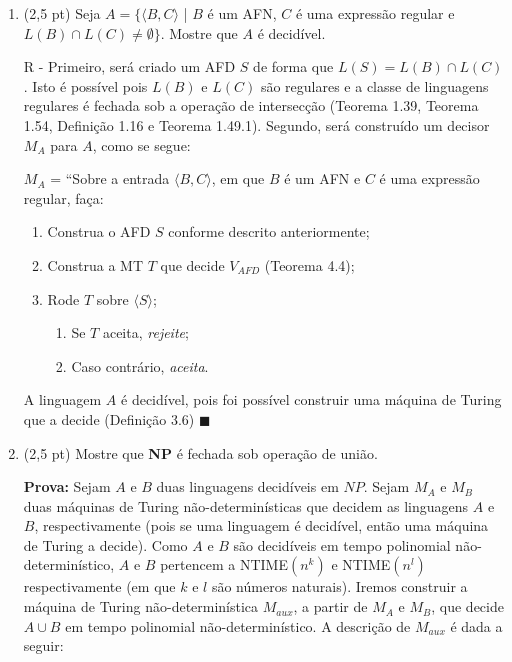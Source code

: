\documentclass[12pt,a4paper,oneside]{article}
\begin{document}
\begin{enumerate}
{		A linguagem $A$ é decidível, pois foi possível construir uma máquina de Turing que a decide (Definição 3.6) $\blacksquare$
		
	}	
	
	\newpage
	
	\item (2,5 pt)  Seja $A = \{ \langle B,C \rangle$ | $B$ é um AFN, $C$ é uma expressão regular e $L(B) \cap L(C) \not= \emptyset \}$. Mostre que $A$ é decidível.
	
	\vspace{0.3cm}
	
	\vspace{0.3cm}
	
	{\color{blue}
		R - Primeiro, será criado um AFD $S$ de forma que $L(S) = L(B) \cap L(C)$. Isto é possível pois $L(B)$ e $L(C)$ são regulares e a classe de linguagens regulares é fechada sob a operação de intersecção (Teorema 1.39, Teorema 1.54, Definição 1.16 e Teorema 1.49.1). Segundo, será construído um decisor $M_A$ para $A$, como se segue:
		
		$M_A$ = ``Sobre a entrada $\langle B, C \rangle$, em que $B$ é um AFN e $C$ é uma expressão regular, faça:
			\begin{enumerate}
				\item Construa o AFD $S$ conforme descrito anteriormente;
				\item Construa a MT $T$ que decide $V_{AFD}$ (Teorema 4.4);
				\item Rode $T$ sobre $\langle S \rangle$;
				\begin{enumerate}
					\item Se $T$ aceita, {\it rejeite};
					\item Caso contrário, {\it aceita}.
				\end{enumerate}					
			\end{enumerate}
		
		A linguagem $A$ é decidível, pois foi possível construir uma máquina de Turing que a decide (Definição 3.6) $\blacksquare$
		
	}
	
	\newpage	
	
	\item (2,5 pt) Mostre que {\bf NP} é fechada sob operação de união.
	
	\vspace{0.3cm}
	
	{\color{blue}
		{\bf Prova:} Sejam $A$ e $B$ duas linguagens decidíveis em $NP$. Sejam $M_A$ e $M_B$ duas máquinas de Turing não-determinísticas que decidem as linguagens $A$ e $B$, respectivamente (pois se uma linguagem é decidível, então uma máquina de Turing a decide). Como $A$ e $B$ são decidíveis em tempo polinomial não-determinístico, $A$ e $B$ pertencem a {\sc NTIME}$(n^k)$ e {\sc NTIME}$(n^l)$ respectivamente (em que $k$ e $l$ são números naturais).  Iremos construir a máquina de Turing não-determinística $M_{aux}$, a partir de $M_A$ e $M_B$, que decide $A \cup B$ em tempo polinomial não-determi\-nís\-ti\-co. A descrição de $M_{aux}$ é dada a seguir:
			
}
\end{enumerate}
\end{document}
